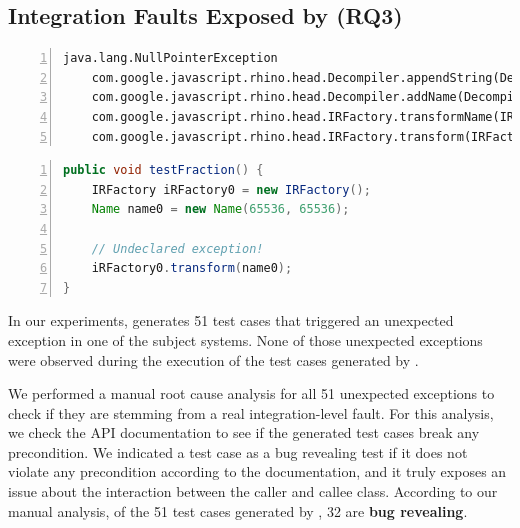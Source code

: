 \subsection{Integration Faults Exposed by \integration (RQ3)}

\begin{lstlisting}[frame=tb,
    caption={Exception captured only by \integration in Closure},
    label=list:divzero,
    captionpos=t,
    numbers=left,
    float=t,
    belowskip=-2.5em,
    firstnumber=1]
    java.lang.NullPointerException
    com.google.javascript.rhino.head.Decompiler.appendString(Decompiler.java:226)
    com.google.javascript.rhino.head.Decompiler.addName(Decompiler.java:156)
    com.google.javascript.rhino.head.IRFactory.transformName(IRFactory.java:833)
    com.google.javascript.rhino.head.IRFactory.transform(IRFactory.java:157)
\end{lstlisting}

\begin{lstlisting}[frame=tb,
    caption={\cling test case triggering the crash in Listing~\ref{list:divzero}},
    label=list:testdivzero,
    language=java,
    captionpos=t,
    numbers=left,
    float=t,
    belowskip=-2.5em,
    firstnumber=1]
public void testFraction() {
    IRFactory iRFactory0 = new IRFactory();
    Name name0 = new Name(65536, 65536);

    // Undeclared exception!
    iRFactory0.transform(name0);
}
\end{lstlisting}

In our experiments, \integration generates 51 test cases that triggered an unexpected exception in one of the subject systems. 
None of those unexpected exceptions were observed during the execution of the test cases generated by \evosuite.

We performed a manual root cause analysis for all 51 unexpected exceptions to check if they are stemming from a real integration-level fault. For this analysis, we check the API documentation to see if the generated test cases break any precondition. We indicated a test case as a bug revealing test if it does not violate any precondition according to the documentation, and it truly exposes an issue about the interaction between the caller and callee class. According to our manual analysis, of the 51 test cases generated by \cling, 32 are \textbf{bug revealing}.

